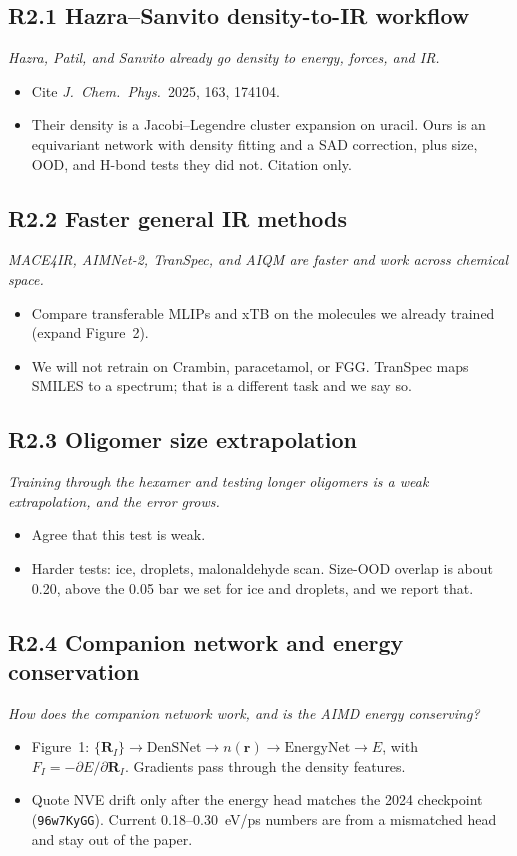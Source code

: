 \documentclass[11pt]{article}
\newcommand{\revpoint}[1]{\textit{#1}\par\nopagebreak\vspace{0.35em}}
\newcommand{\revhead}[1]{\subsection*{#1}}
\begin{document}
\revhead{R2.1 Hazra--Sanvito density-to-IR workflow}
\revpoint{Hazra, Patil, and Sanvito already go density to energy, forces, and IR.}
\begin{itemize}
  \item Cite \textit{J.\ Chem.\ Phys.}\ 2025, 163, 174104.
  \item Their density is a Jacobi--Legendre cluster expansion on uracil. Ours is an
        equivariant network with density fitting and a SAD correction, plus size, OOD,
        and H-bond tests they did not. Citation only.
\end{itemize}

\revhead{R2.2 Faster general IR methods}
\revpoint{MACE4IR, AIMNet-2, TranSpec, and AIQM are faster and work across chemical space.}
\begin{itemize}
  \item Compare transferable MLIPs and xTB on the molecules we already trained
        (expand Figure~2).
  \item We will not retrain on Crambin, paracetamol, or FGG. TranSpec maps SMILES to
        a spectrum; that is a different task and we say so.
\end{itemize}

\revhead{R2.3 Oligomer size extrapolation}
\revpoint{Training through the hexamer and testing longer oligomers is a weak extrapolation, and the error grows.}
\begin{itemize}
  \item Agree that this test is weak.
  \item Harder tests: ice, droplets, malonaldehyde scan. Size-OOD overlap is about
        0.20, above the 0.05 bar we set for ice and droplets, and we report that.
\end{itemize}

\revhead{R2.4 Companion network and energy conservation}
\revpoint{How does the companion network work, and is the AIMD energy conserving?}
\begin{itemize}
  \item Figure~1: $\{\mathbf{R}_I\}\to\mathrm{DenSNet}\to n(\mathbf{r})\to\mathrm{EnergyNet}\to E$,
        with $F_I=-\partial E/\partial\mathbf{R}_I$. Gradients pass through the density
        features.
  \item Quote NVE drift only after the energy head matches the 2024 checkpoint
        (\texttt{96w7KyGG}). Current 0.18--0.30~eV/ps numbers are from a mismatched
        head and stay out of the paper.
\end{itemize}
\end{document}
